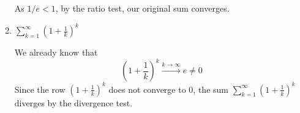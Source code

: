 \documentclass[week=6]{homework}
\begin{document}
\begin{questions}
\begin{enumerate}[label=(\alph*)]
	    	As $1/e < 1$, by the ratio test, our original sum converges.
	    	
	    	\addtocounter{enumi}{1}
	    	\item $\displaystyle \sum_{k=1}^{\infty} \left(1 + \frac{1}{k}\right)^k$
	    	
	    	We already know that
	    	\[
		    	\left(1 + \frac{1}{k}\right)^k \xrightarrow{k \to \infty} e \neq 0
	    	\]
	    	Since the row $\left(1 + \frac{1}{k}\right)^k$ does not converge to $0$, the sum $\sum_{k=1}^{\infty} \left(1 + \frac{1}{k}\right)^k$ diverges by the divergence test.
	    \end{enumerate}
     \end{questions}
\end{document}
